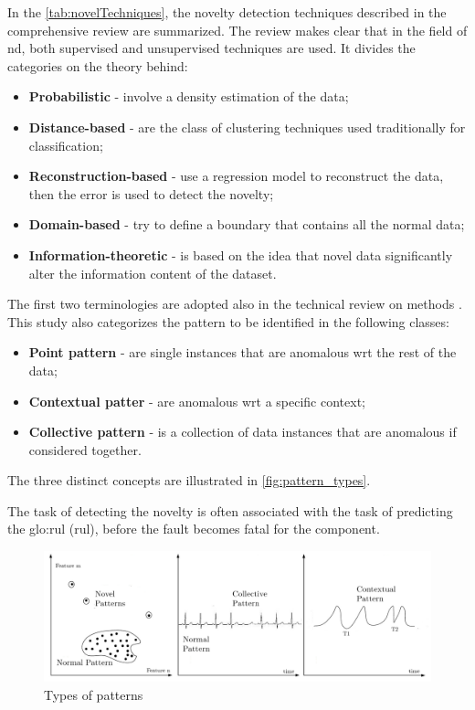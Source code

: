 In the \autoref{tab:novelTechniques}, the novelty detection techniques described in the comprehensive review \cite{NoveltyReview} are summarized. The review makes clear that in the field of \gls{nd}, both supervised and unsupervised techniques are used. It divides  the categories on the theory behind:
\begin{itemize}
    \item \textbf{Probabilistic} - involve a density estimation of the data;
    \item \textbf{Distance-based} - are the class of clustering techniques used traditionally for classification;
    \item \textbf{Reconstruction-based} - use a regression model to reconstruct the data, then the error is used to detect the novelty;
    \item \textbf{Domain-based} - try to define a boundary that contains all the normal data;
    \item \textbf{Information-theoretic} - is based on the idea that novel data significantly alter the information content of the dataset.
\end{itemize}

{}

The first two terminologies are adopted also in the technical review on methods \cite{NoveltyTech}. This study also categorizes the pattern to be identified in the following classes:
\begin{itemize}
    \item \textbf{Point pattern} - are single instances that are anomalous \gls{wrt} the rest of the data;
    \item \textbf{Contextual patter} - are anomalous \gls{wrt} a specific context;
    \item \textbf{Collective pattern} - is a collection of data instances that are anomalous if considered together.
\end{itemize}

The three distinct concepts are illustrated in \autoref{fig:pattern_types}.

The task of detecting the novelty is often associated with the task of predicting the \gls{glo:rul} (\gls{rul}), before the fault becomes fatal for the component.

\begin{figure}
    \centering
    \includegraphics[width=\textwidth]{images/StateArt/patterns.png}
    \caption{Types of patterns \cite{NoveltyTech}}
    \label{fig:pattern_types}
\end{figure}


